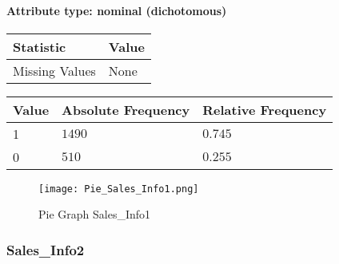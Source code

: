 \paragraph{Attribute type: nominal (dichotomous)}
\qquad
\begin{table}[H]
	\renewcommand{\arraystretch}{1.25}
	\begin{tabular}{l|l}
		\textbf{Statistic} & \textbf{Value}\\\hline
		Missing Values& None\\\hline
	\end{tabular}
\end{table}
\begin{table}[H]
	\renewcommand{\arraystretch}{1.25}
	\begin{tabular}{l|l|l}
		\textbf{Value} & \textbf{Absolute Frequency} & \textbf{Relative Frequency}\\\hline
		1&$1490$&$0.745$\\\hline
		0&$510$&$0.255$
	\end{tabular}
\end{table}
\begin{figure}[H]
	\begin{center}
		\texttt{[image: Pie\_Sales\_Info1.png]}
	\end{center}
	\caption{Pie Graph Sales\_Info1}
\end{figure}

\subsubsection{Sales\_Info2}
